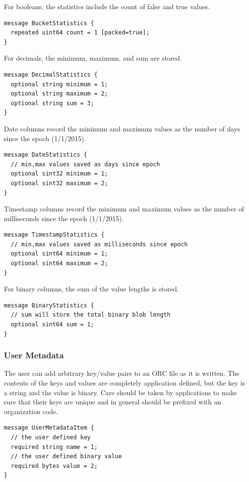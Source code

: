 \documentclass{article}
\begin{document}
For booleans, the statistics include the count of false and true values.

\begin{verbatim}
message BucketStatistics {
  repeated uint64 count = 1 [packed=true];
}
\end{verbatim}

For decimals, the minimum, maximum, and sum are stored.

\begin{verbatim}
message DecimalStatistics {
  optional string minimum = 1;
  optional string maximum = 2;
  optional string sum = 3;
}
\end{verbatim}

Date columns record the minimum and maximum values as the number of days since
the epoch (1/1/2015).

\begin{verbatim}
message DateStatistics {
  // min,max values saved as days since epoch
  optional sint32 minimum = 1;
  optional sint32 maximum = 2;
}
\end{verbatim}

Timestamp columns record the minimum and maximum values as the number of 
milliseconds since the epoch (1/1/2015).

\begin{verbatim}
message TimestampStatistics {
  // min,max values saved as milliseconds since epoch
  optional sint64 minimum = 1;
  optional sint64 maximum = 2;
}
\end{verbatim}

For binary columns, the sum of the value lengths is stored.

\begin{verbatim}
message BinaryStatistics {
  // sum will store the total binary blob length
  optional sint64 sum = 1;
}
\end{verbatim}

\subsubsection{User Metadata}

The user can add arbitrary key/value pairs to an ORC file as it is
written. The contents of the keys and values are completely
application defined, but the key is a string and the value is
binary. Care should be taken by applications to make sure that their
keys are unique and in general should be prefixed with an organization
code.

\begin{verbatim}
message UserMetadataItem {
  // the user defined key
  required string name = 1;
  // the user defined binary value
  required bytes value = 2;
}
\end{verbatim}
\end{document}
